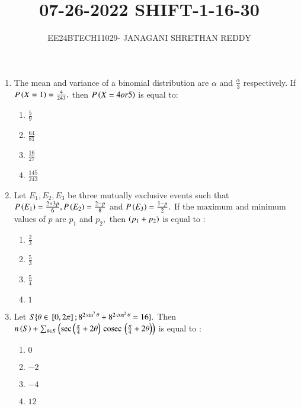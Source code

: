 \documentclass[journal,12pt,twocolumn]{IEEEtran}
\theoremstyle{remark}
\begin{document}
 


\vspace{3cm}

\title{07-26-2022 SHIFT-1-16-30}
\author{EE24BTECH11029- JANAGANI SHRETHAN REDDY}
\maketitle{}
\newpage
\bigskip
\renewcommand{\thefigure}{\theenumi}
\renewcommand{\thetable}{\theenum}
\begin{enumerate}
    \item The mean and variance of a binomial distribution are $\alpha$ and $\frac{\alpha}{3}$ respectively. If $P\left(X=1\right)=\frac{4}{243},$ then $P\left(X=4 or 5\right)$ is equal to:
    \begin{enumerate}
        \item $\frac{5}{9}$
        \item $\frac{64}{81}$
        \item $\frac{16}{27}$
        \item $\frac{145}{243}$\\
    \end{enumerate}
    \item Let $E_1,E_2,E_3$ be three mutually exclusive events such that $P\left(E_1\right)=\frac{2+3p}{6},P\left(E_2\right)=\frac{2-p}{8}$ and $P\left(E_3\right)=\frac{1-p}{2}.$ If the maximum and minimum values of $p$ are $p_1$ and $p_2,$ then $\left(p_1+p_2\right)$ is equal to :
    \begin{enumerate}
        \item $\frac{2}{3}$
        \item $\frac{5}{3}$
        \item $\frac{5}{4}$
        \item $1$\\
    \end{enumerate}
    \item Let $S\{\theta\in{}\left[0,2\pi\right];8^{2\sin^2\theta}+8^{2\cos^2\theta}=16\}.$ Then $n\left(S\right)+\sum_{\theta\in S}\left(\sec\left(\frac{\pi}{4}+2\theta\right)\,\text{cosec}\,\left(\frac{\pi}{4}+2\theta\right)\right)$ is equal to :
    \begin{enumerate}
        \item $0$
        \item $-2$
        \item $-4$
        \item $12$\\
    \end{enumerate}

\end{enumerate}
\end{document}

